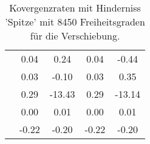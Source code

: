\begin{table}
\begin{tabular}{c|cc|cc|}
\multicolumn{1}{|c|}{} & \multicolumn{1}{|c|}{      0.04} & \multicolumn{1}{|c|}{      0.24} & \multicolumn{1}{|c|}{      0.04} & \multicolumn{1}{|c|}{     -0.44} \\ 
\multicolumn{1}{|c|}{} & \multicolumn{1}{|c|}{      0.03} & \multicolumn{1}{|c|}{     -0.10} & \multicolumn{1}{|c|}{      0.03} & \multicolumn{1}{|c|}{      0.35} \\ 
\multicolumn{1}{|c|}{} & \multicolumn{1}{|c|}{      0.29} & \multicolumn{1}{|c|}{    -13.43} & \multicolumn{1}{|c|}{      0.29} & \multicolumn{1}{|c|}{    -13.14} \\ 
\multicolumn{1}{|c|}{} & \multicolumn{1}{|c|}{      0.00} & \multicolumn{1}{|c|}{      0.01} & \multicolumn{1}{|c|}{      0.00} & \multicolumn{1}{|c|}{      0.01} \\ 
\multicolumn{1}{|c|}{} & \multicolumn{1}{|c|}{     -0.22} & \multicolumn{1}{|c|}{     -0.20} & \multicolumn{1}{|c|}{     -0.22} & \multicolumn{1}{|c|}{     -0.20} \\ 
\hline 
\end{tabular}\caption{Kovergenzraten mit Hinderniss 'Spitze' mit 8450 Freiheitsgraden für die Verschiebung.}\label{tab:Rate_Spitze_level5}
\end{table} 
